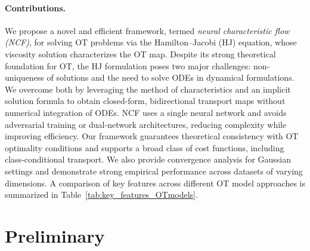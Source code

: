 \documentclass{article} %
\theoremstyle{plain}
\theoremstyle{definition}
\theoremstyle{remark}
\begin{document}
\paragraph{Contributions.}  We propose a novel and efficient framework, termed \textit{neural characteristic flow (NCF)}, for solving OT problems via the Hamilton--Jacobi (HJ) equation, whose viscosity solution characterizes the OT map. Despite its strong theoretical foundation for OT, the HJ formulation poses two major challenges: non-uniqueness of solutions and the need to solve ODEs in dynamical formulations. We overcome both by leveraging the method of characteristics and an implicit solution formula \citep{park2025implicit} to obtain closed-form, bidirectional transport maps without numerical integration of ODEs. NCF uses a single neural network and avoids adversarial training or dual-network architectures, reducing complexity while improving efficiency. Our framework guarantees theoretical consistency with OT optimality conditions and supports a broad class of cost functions, including class-conditional transport. We also provide convergence analysis for Gaussian settings and demonstrate strong empirical performance across datasets of varying dimensions. 
A comparison of key features across different OT model approaches is summarized in Table~\ref{tab:key_features_OTmodels}.
\begin{table}[t]
\centering
{}
\caption{Comparison of key features across different OT model approaches.}\label{tab:key_features_OTmodels}
\end{table}


\section{Preliminary}\vspace{-0.2em}
\end{document}
